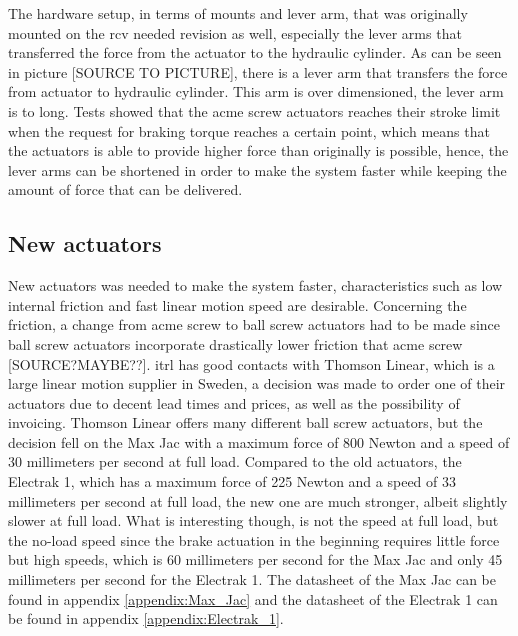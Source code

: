 \documentclass[a4paper,11pt]{kth-mag}
\begin{document}
The hardware setup, in terms of mounts and lever arm, that was originally mounted on the \gls{rcv} needed revision as well, especially the lever arms that transferred the force from the actuator to the hydraulic cylinder. As can be seen in picture [SOURCE TO PICTURE], there is a lever arm that transfers the force from actuator to hydraulic cylinder. This arm is over dimensioned, the lever arm is to long. Tests showed that the acme screw actuators reaches their stroke limit when the request for braking torque reaches a certain point, which means that the actuators is able to provide higher force than  originally is possible, hence, the lever arms can be shortened in order to make the system faster while keeping the amount of force that can be delivered. 

\subsection{New actuators}
New actuators was needed to make the system faster, characteristics such as low internal friction and fast linear motion speed are desirable. Concerning the friction, a change from acme screw to ball screw actuators had to be made since ball screw actuators incorporate drastically lower friction that acme screw [SOURCE?MAYBE??]. \gls{itrl} has good contacts with Thomson Linear, which is a large linear motion supplier in Sweden, a decision was made to order one of their actuators due to decent lead times and prices, as well as the possibility of invoicing. Thomson Linear offers many different ball screw actuators, but the decision fell on the Max Jac with a maximum force of 800 Newton and a speed of 30 millimeters per second at full load. Compared to the old actuators, the Electrak 1, which has a maximum force of 225 Newton and a speed of 33 millimeters per second at full load, the new one are much stronger, albeit slightly slower at full load. What is interesting though, is not the speed at full load, but the no-load speed since the brake actuation in the beginning requires little force but high speeds, which is 60 millimeters per second for the Max Jac and only 45 millimeters per second for the Electrak 1. The datasheet of the Max Jac can be found in appendix \ref{appendix:Max_Jac} and the datasheet of the Electrak 1 can be found in appendix \ref{appendix:Electrak_1}.\\
\end{document}
